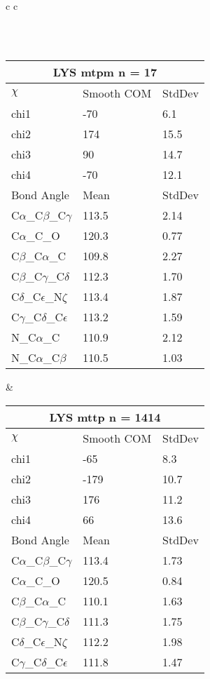 \begin{longtable}{ c c }
\begin{tabular}{ l l l }
  \bottomrule
  \end{tabular}
  \\
  \begin{tabular}{ l l l }
  \toprule
  \multicolumn{3}{c}{LYS \textbf{mtpm} n = 17} \\ \toprule
  $\chi$       & Smooth COM & StdDev \\ \midrule
  chi1 & -70 & 6.1 \\ 
  chi2 & 174 & 15.5 \\ 
  chi3 & 90 & 14.7 \\ 
  chi4 & -70 & 12.1 \\ \midrule
  Bond Angle   & Mean     & StdDev \\ \midrule
  C$\alpha$\_C$\beta$\_C$\gamma$ & 113.5 & 2.14\\
  C$\alpha$\_C\_O & 120.3 & 0.77\\
  C$\beta$\_C$\alpha$\_C & 109.8 & 2.27\\
  C$\beta$\_C$\gamma$\_C$\delta$ & 112.3 & 1.70\\
  C$\delta$\_C$\epsilon$\_N$\zeta$ & 113.4 & 1.87\\
  C$\gamma$\_C$\delta$\_C$\epsilon$ & 113.2 & 1.59\\
  N\_C$\alpha$\_C & 110.9 & 2.12\\
  N\_C$\alpha$\_C$\beta$ & 110.5 & 1.03\\
  \bottomrule
  \end{tabular}
  &
  \begin{tabular}{ l l l }
  \toprule
  \multicolumn{3}{c}{LYS \textbf{mttp} n = 1414} \\ \toprule
  $\chi$       & Smooth COM & StdDev \\ \midrule
  chi1 & -65 & 8.3 \\ 
  chi2 & -179 & 10.7 \\ 
  chi3 & 176 & 11.2 \\ 
  chi4 & 66 & 13.6 \\ \midrule
  Bond Angle   & Mean     & StdDev \\ \midrule
  C$\alpha$\_C$\beta$\_C$\gamma$ & 113.4 & 1.73\\
  C$\alpha$\_C\_O & 120.5 & 0.84\\
  C$\beta$\_C$\alpha$\_C & 110.1 & 1.63\\
  C$\beta$\_C$\gamma$\_C$\delta$ & 111.3 & 1.75\\
  C$\delta$\_C$\epsilon$\_N$\zeta$ & 112.2 & 1.98\\
  C$\gamma$\_C$\delta$\_C$\epsilon$ & 111.8 & 1.47\\

\end{tabular}
\end{longtable}
